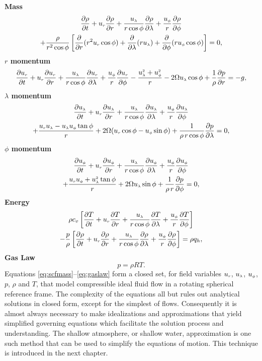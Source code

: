 {\bfseries Mass}
\begin{multline}
\drhod{t}+ \ur \drhod{r} + \frac{\ulam}{r\cos\phi}\drhod{\lambda}+\frac{\uphi}{r}\drhod{\phi} \\ 
+ \frac{\rho}{r^2 \cos\phi}\left[ \frac{\partial}{\partial r}(r^2 \ur \cos\phi) + \frac{\partial}{\partial \lambda}(r \ulam) + \frac{\partial}{\partial \phi}(r \uphi \cos\phi)  \right]=0, \label{eq:scfmass}
\end{multline}
{\bfseries \boldmath$r$ momentum}
\begin{equation}
\durd{t} +\ur\durd{r}+ \frac{\ulam}{r\cos\phi}\durd{\lambda}+\frac{\uphi}{r}\durd{\phi}-\frac{\ulams+\uphis}{r}-2\Omega\ulam\cos\phi+\frac{1}{\rho}\dpd{r}= -g,\label{eq:scfrmom}
\end{equation}
{\bfseries \boldmath$\lambda$ momentum}
\begin{multline}
\dulamd{t} +\ur\dulamd{r}+ \frac{\ulam}{r\cos\phi}\dulamd{\lambda}+\frac{\uphi}{r}\dulamd{\phi}\\+\frac{\ur\ulam-\ulam\uphi\tan\phi}{r}+2\Omega(\ur\cos\phi-\uphi\sin\phi)+\frac{1}{\rho\,r\cos\phi}\dpd{\lambda}= 0, \label{eq:scflammom}
\end{multline}
{\bfseries \boldmath$\phi$ momentum}
\begin{multline}
\duphid{t} +\ur\duphid{r}+ \frac{\ulam}{r\cos\phi}\duphid{\lambda}+\frac{\uphi}{r}\duphid{\phi}\\+\frac{\ur\uphi+\ulams\tan\phi}{r}+2\Omega\ulam\sin\phi+\frac{1}{\rho\,r}\dpd{\phi}= 0, \label{eq:scfphimom}
\end{multline}
{\bfseries Energy}
\begin{multline}
\rho c_v \left[\dTd{t}+ \ur \dTd{r} + \frac{\ulam}{r\cos\phi}\dTd{\lambda}+\frac{\uphi}{r}\dTd{\phi} \right] \\
 - \frac{p}{\rho} \left[ \drhod{t}+ \ur \drhod{r} + \frac{\ulam}{r\cos\phi}\drhod{\lambda}+\frac{\uphi}{r}\drhod{\phi} \right] = \rho q_h,
\label{eq:scfenergy}
\end{multline}
{\bfseries Gas Law}
\begin{equation}
p=\rho R T.
\label{eq:gaslaw}
\end{equation}
Equations \eqref{eq:scfmass}--\eqref{eq:gaslaw} form a closed set, for field variables $\ur$, $\ulam$, $\uphi$, $p$, $\rho$ and $T$, that model compressible ideal fluid flow in a rotating spherical reference frame. The complexity of the equations all but rules out analytical solutions in closed form, except for the simplest of flows. Consequently it is almost always necessary to make idealizations and approximations that yield simplified governing equations which facilitate the solution process and understanding. The shallow atmosphere, or shallow water, approximation is one such method that can be used to simplify the equations of motion. This technique is introduced in the next chapter.



